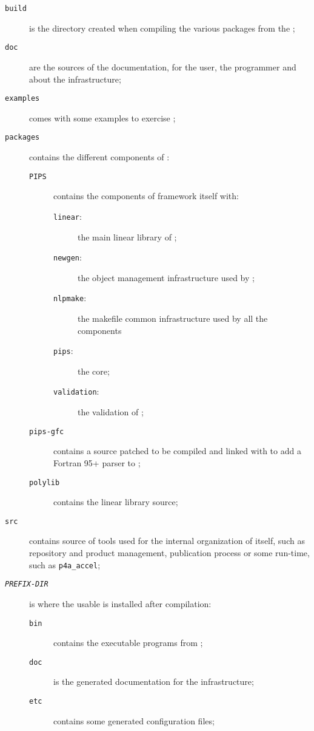 \documentclass[a4paper]{article}
\begin{document}
\begin{description}
\item[\texttt{build}] is the directory created when compiling the various
  \Apfa packages from the \Aautotools;
\item[\texttt{doc}] are the sources of the \Apfa documentation, for the
  user, the programmer and about the infrastructure;
\item[\texttt{examples}] comes with some examples to exercise \Apfa;
\item[\texttt{packages}] contains the different components of \Apfa:
  \begin{description}
  \item[\texttt{PIPS}] contains the components of \Apips framework itself
    with:
    \begin{description}
    \item[\texttt{linear}:] the main linear library of \Apips;
    \item[\texttt{newgen}:] the object management infrastructure used by
      \Apips;
    \item[\texttt{nlpmake}:] the makefile common infrastructure used by
      all the \Apips components
    \item[\texttt{pips}:] the \Apips core;
    \item[\texttt{validation}:] the validation of \Apips;
    \end{description}
  \item[\texttt{pips-gfc}] contains a  source patched to be
    compiled and linked with \Apips to add a Fortran 95+ parser to \Apips;
  \item[\texttt{polylib}] contains the \Apolylib linear library source;
  \end{description}
\item[\texttt{src}] contains source of tools used for the internal
  organization of \Apfa itself, such as repository and product management,
  publication process or some run-time, such as \verb|p4a_accel|;
\item[\texttt{\emph{PREFIX-DIR}}] is where the usable \Apfa is installed
  after compilation:
  \begin{description}
  \item[\texttt{bin}] contains the executable programs from \Apfa;
  \item[\texttt{doc}] is the generated documentation for the \Apfa
    infrastructure;
  \item[\texttt{etc}] contains some generated configuration files;

\end{description}
\end{description}
\end{document}

